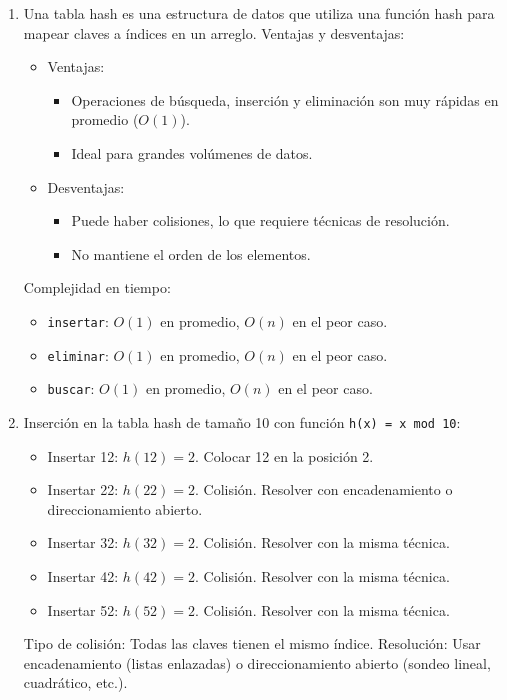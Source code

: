 \documentclass[12pt]{article}
\begin{document}
\begin{enumerate}
            \item Una tabla hash es una estructura de datos que utiliza una función hash para mapear claves a índices en un arreglo. Ventajas y desventajas:
            \begin{itemize}
                \item Ventajas:
                \begin{itemize}
                    \item Operaciones de búsqueda, inserción y eliminación son muy rápidas en promedio (\(O(1)\)).
                    \item Ideal para grandes volúmenes de datos.
                \end{itemize}
                \item Desventajas:
                \begin{itemize}
                    \item Puede haber colisiones, lo que requiere técnicas de resolución.
                    \item No mantiene el orden de los elementos.
                \end{itemize}
            \end{itemize}
            Complejidad en tiempo:
            \begin{itemize}
                \item \texttt{insertar}: \(O(1)\) en promedio, \(O(n)\) en el peor caso.
                \item \texttt{eliminar}: \(O(1)\) en promedio, \(O(n)\) en el peor caso.
                \item \texttt{buscar}: \(O(1)\) en promedio, \(O(n)\) en el peor caso.
            \end{itemize}

            \item Inserción en la tabla hash de tamaño 10 con función \texttt{h(x) = x mod 10}:
            \begin{itemize}
                \item Insertar 12: \(h(12) = 2\). Colocar 12 en la posición 2.
                \item Insertar 22: \(h(22) = 2\). Colisión. Resolver con encadenamiento o direccionamiento abierto.
                \item Insertar 32: \(h(32) = 2\). Colisión. Resolver con la misma técnica.
                \item Insertar 42: \(h(42) = 2\). Colisión. Resolver con la misma técnica.
                \item Insertar 52: \(h(52) = 2\). Colisión. Resolver con la misma técnica.
            \end{itemize}
            Tipo de colisión: Todas las claves tienen el mismo índice. Resolución: Usar encadenamiento (listas enlazadas) o direccionamiento abierto (sondeo lineal, cuadrático, etc.).
        \end{enumerate}
\end{document}
